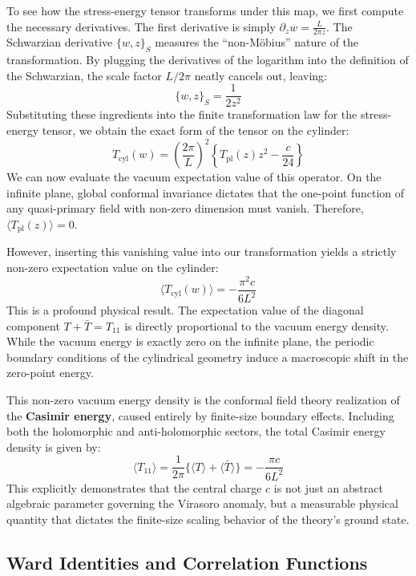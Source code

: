 To see how the stress-energy tensor transforms under this map, we first compute the necessary derivatives. The first derivative is simply \(\partial_z w = \frac{L}{2\pi z}\). The Schwarzian derivative \(\{w, z\}_S\) measures the ``non-Möbius'' nature of the transformation. By plugging the derivatives of the logarithm into the definition of the Schwarzian, the scale factor \(L/2\pi\) neatly cancels out, leaving:
\[
    \{w, z\}_S = \frac{1}{2z^2}
\]
Substituting these ingredients into the finite transformation law for the stress-energy tensor, we obtain the exact form of the tensor on the cylinder:
\[
    T_{\text{cyl}}(w) = \left(\frac{2\pi}{L}\right)^2 \left\{ T_{\text{pl}}(z)z^2 - \frac{c}{24} \right\}
\]
We can now evaluate the vacuum expectation value of this operator. On the infinite plane, global conformal invariance dictates that the one-point function of any quasi-primary field with non-zero dimension must vanish. Therefore, \(\langle T_{\text{pl}}(z) \rangle = 0\).

However, inserting this vanishing value into our transformation yields a strictly non-zero expectation value on the cylinder:
\[
    \langle T_{\text{cyl}}(w) \rangle = -\frac{\pi^2 c}{6L^2}
\]
This is a profound physical result. The expectation value of the diagonal component \(T + \bar{T} = T_{11}\) is directly proportional to the vacuum energy density. While the vacuum energy is exactly zero on the infinite plane, the periodic boundary conditions of the cylindrical geometry induce a macroscopic shift in the zero-point energy.

This non-zero vacuum energy density is the conformal field theory realization of the \textbf{Casimir energy}, caused entirely by finite-size boundary effects. Including both the holomorphic and anti-holomorphic sectors, the total Casimir energy density is given by:
\[
    \langle T_{11} \rangle = \frac{1}{2\pi} \{ \langle T \rangle + \langle \bar{T} \rangle \} = -\frac{\pi c}{6L^2}
\]
This explicitly demonstrates that the central charge \(c\) is not just an abstract algebraic parameter governing the Virasoro anomaly, but a measurable physical quantity that dictates the finite-size scaling behavior of the theory's ground state.

\subsection{Ward Identities and Correlation Functions}

